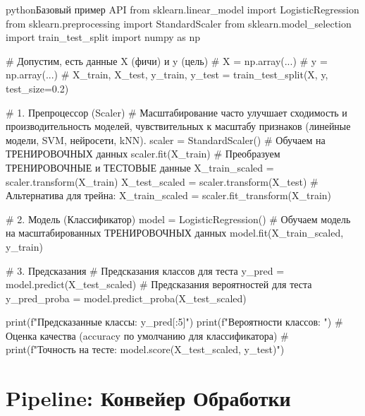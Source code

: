 \begin{codebox}{python}{Базовый пример API}
from sklearn.linear_model import LogisticRegression
from sklearn.preprocessing import StandardScaler
from sklearn.model_selection import train_test_split
import numpy as np

# Допустим, есть данные X (фичи) и y (цель)
# X = np.array(...)
# y = np.array(...)
# X_train, X_test, y_train, y_test = train_test_split(X, y, test_size=0.2)

# 1. Препроцессор (Scaler)
# Масштабирование часто улучшает сходимость и производительность моделей, чувствительных к масштабу признаков (линейные модели, SVM, нейросети, kNN).
scaler = StandardScaler()
# Обучаем на ТРЕНИРОВОЧНЫХ данных
scaler.fit(X_train)
# Преобразуем ТРЕНИРОВОЧНЫЕ и ТЕСТОВЫЕ данные
X_train_scaled = scaler.transform(X_train)
X_test_scaled = scaler.transform(X_test)
# Альтернатива для трейна: X_train_scaled = scaler.fit_transform(X_train)

# 2. Модель (Классификатор)
model = LogisticRegression()
# Обучаем модель на масштабированных ТРЕНИРОВОЧНЫХ данных
model.fit(X_train_scaled, y_train)

# 3. Предсказания
# Предсказания классов для теста
y_pred = model.predict(X_test_scaled)
# Предсказания вероятностей для теста
y_pred_proba = model.predict_proba(X_test_scaled)

print(f"Предсказанные классы: {y_pred[:5]}")
print(f"Вероятности классов: ")
# Оценка качества (accuracy по умолчанию для классификатора)
# print(f"Точность на тесте: {model.score(X_test_scaled, y_test)}")
\end{codebox}

\section{Pipeline: Конвейер Обработки}

